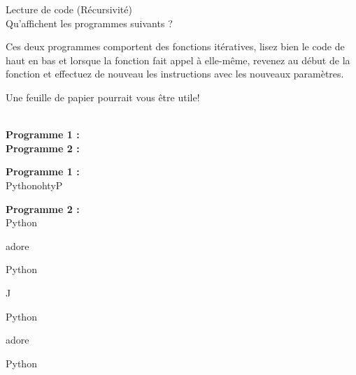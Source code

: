\begin{Exercice}[5 minutes] Lecture de code (Récursivité)\\
Qu'affichent les programmes suivants ? \\

\begin{conseil}
   Ces deux programmes comportent des fonctions itératives, lisez bien le code de haut en bas et lorsque la fonction fait appel à elle-même, revenez au début de la fonction et effectuez de nouveau les instructions avec les nouveaux paramètres.
   
   Une feuille de papier pourrait vous être utile!\\
\end{conseil}

\textbf{\\Programme 1 :} \\

     

\textbf{Programme 2 :} \\

    

    
\begin{solution}
    \textbf{Programme 1 :} \\

    PythonohtyP
    
\end{solution}


\begin{solution}   
    \textbf{Programme 2 :} \\

    Python
    
    adore
    
    Python
    
    J
    
    Python
    
    adore
    
    Python
    
\end{solution}

\end{Exercice}

